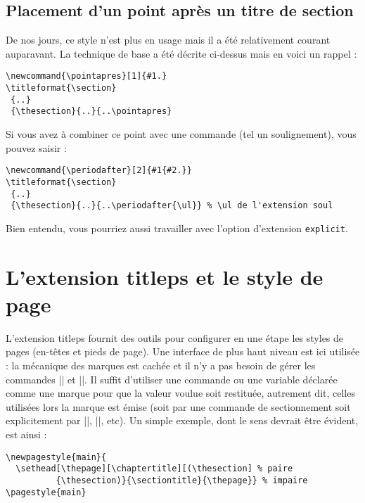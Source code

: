\documentclass[a4paper]{ltxguide}
\begin{document}
\subsection{Placement d'un point après un titre de section} \label{sec:dotafter}

De nos jours, ce style n'est plus en usage mais il a été relativement courant
auparavant. La technique de base a été décrite ci-dessus mais en voici un
rappel :
\begin{verbatim}
\newcommand{\pointapres}[1]{#1.}
\titleformat{\section}
 {..}
 {\thesection}{..}{..\pointapres}
\end{verbatim}

Si vous avez à combiner ce point avec une commande (tel un soulignement), vous
pouvez saisir :
\begin{verbatim}
\newcommand{\periodafter}[2]{#1{#2.}}
\titleformat{\section}
 {..}
 {\thesection}{..}{..\periodafter{\ul}} % \ul de l'extension soul
\end{verbatim}

Bien entendu, vous pourriez aussi travailler avec l'option d'extension 
\texttt{explicit}.

\section{L'extension \textsf{titleps} et le style de page}

L'extension \textsf{titleps} fournit des outils pour configurer en une 
étape les styles de pages (en-têtes et pieds de page). Une interface de plus haut
niveau est ici utilisée : la mécanique des marques est cachée et il n'y a
pas besoin de gérer les commandes |\leftmark| et |\rightmark|. Il suffit d'utiliser
une commande ou une variable déclarée comme une \og marque \fg{} pour que la valeur
voulue soit restituée, autrement dit, celles utilisées lors la marque est émise (soit 
par une commande de sectionnement soit explicitement par |\chaptermark|, 
|\sectionmark|, etc). Un simple exemple, dont le sens devrait être évident, est ainsi :
\begin{verbatim}
\newpagestyle{main}{
  \sethead[\thepage][\chaptertitle][(\thesection] % paire
          {\thesection)}{\sectiontitle}{\thepage}} % impaire
\pagestyle{main}
\end{verbatim}
\end{document}
